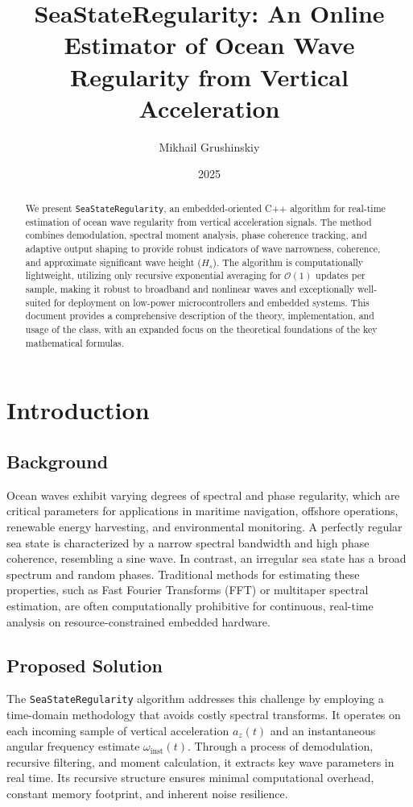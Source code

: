 \documentclass[11pt]{article}
\title{SeaStateRegularity: An Online Estimator of Ocean Wave Regularity from Vertical Acceleration}
\author{Mikhail Grushinskiy}
\date{2025}
\begin{document}
\maketitle

\begin{abstract}
We present \texttt{SeaStateRegularity}, an embedded-oriented C++ algorithm for real-time estimation of ocean wave regularity from vertical acceleration signals. The method combines demodulation, spectral moment analysis, phase coherence tracking, and adaptive output shaping to provide robust indicators of wave narrowness, coherence, and approximate significant wave height ($H_s$). The algorithm is computationally lightweight, utilizing only recursive exponential averaging for $\mathcal{O}(1)$ updates per sample, making it robust to broadband and nonlinear waves and exceptionally well-suited for deployment on low-power microcontrollers and embedded systems. This document provides a comprehensive description of the theory, implementation, and usage of the class, with an expanded focus on the theoretical foundations of the key mathematical formulas.
\end{abstract}

\section{Introduction}
\subsection{Background}
Ocean waves exhibit varying degrees of spectral and phase regularity, which are critical parameters for applications in maritime navigation, offshore operations, renewable energy harvesting, and environmental monitoring. A perfectly regular sea state is characterized by a narrow spectral bandwidth and high phase coherence, resembling a sine wave. In contrast, an irregular sea state has a broad spectrum and random phases. Traditional methods for estimating these properties, such as Fast Fourier Transforms (FFT) or multitaper spectral estimation, are often computationally prohibitive for continuous, real-time analysis on resource-constrained embedded hardware.

\subsection{Proposed Solution}
The \texttt{SeaStateRegularity} algorithm addresses this challenge by employing a time-domain methodology that avoids costly spectral transforms. It operates on each incoming sample of vertical acceleration $a_z(t)$ and an instantaneous angular frequency estimate $\omega_{\text{inst}}(t)$. Through a process of demodulation, recursive filtering, and moment calculation, it extracts key wave parameters in real time. Its recursive structure ensures minimal computational overhead, constant memory footprint, and inherent noise resilience.
\end{document}
